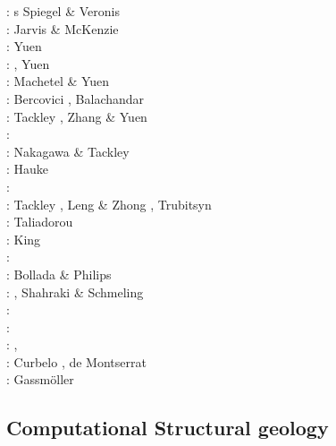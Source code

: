 \begin{scriptsize}
\nineteensixty: s Spiegel \& Veronis \cite{spve60}\\
\nineteeneighty: Jarvis \& McKenzie \cite{jamc80}\\
\nineteeneightyseven:  Yuen \etal \cite{yuqh87}\\
\nineteeneightyeight: \cite{glat88}, Yuen \etal{} \cite{yuzl88} \\
\nineteeneightynine: Machetel \& Yuen \cite{mayu89} \\
\nineteenninetytwo: Bercovici \etal \cite{besg92}, Balachandar \etal \cite{bayr92}\\
\nineteenninetysix: Tackley \cite{tack96}, Zhang \& Yuen \cite{zhyu96}\\
\nineteenninetyeight: \cite{mite98} \\
\twothousandfour: Nakagawa \& Tackley \cite{nata04}\\
\twothousandfive: Hauke \etal \cite{halg05a,halg05b}\\
\twothousandseven: \cite{feku07} \\
\twothousandeight: Tackley \cite{tack08}, Leng \& Zhong \cite{lezh08}, Trubitsyn \cite{trub08}\\
\twothousandnine: Taliadorou \etal \cite{tagm09} \\
\twothousandten: King \etal \cite{kilv10}\\
\twothousandeleven: \cite{talz11}\\
\twothousandtwelve: Bollada \& Philips \cite{boph12}\\
\twothousandthirteen: \cite{lizh13}, Shahraki \& Schmeling \cite{shsc13}\\
\twothousandfifteen: \cite{kamo15}\\
\twothousandsixteen: \cite{ghbu16}\\
\twothousandeighteen: \cite{cogb18}, \cite{ghbu18}\\
\twothousandnineteen: Curbelo \etal \cite{cuda19}, de Montserrat \etal \cite{demh19}\\
\twothousandtwenty: Gassm{\"o}ller \etal \cite{gadb20}
\end{scriptsize}

\subsection{Computational Structural geology}

